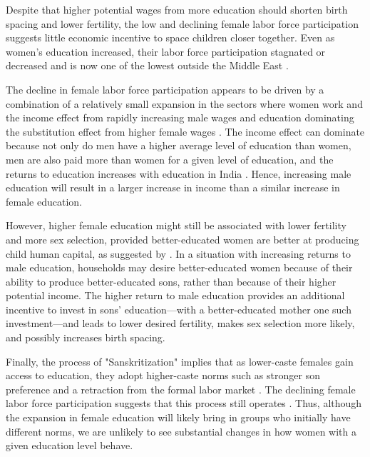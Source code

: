 \documentclass[12pt,letterpaper]{article}
\begin{document}
Despite that higher potential wages from more education should shorten birth spacing and
lower fertility, the low and declining female labor force participation suggests little
economic incentive to space children closer together.
Even as women's education increased, their labor force participation stagnated or 
decreased and is now one of the lowest outside the Middle East 
\citep{Klasen2015,Fletcher2017,Afridi2018,Bhargava2018,Chatterjee2018}.

The decline in female labor force participation appears to be driven by a combination
of a relatively small expansion in the sectors where women work and the income effect 
from rapidly increasing male wages and education dominating the substitution effect from 
higher female wages \citep{Klasen2015,Bhargava2018}.
The income effect can dominate because not only do men have a higher average level of 
education than women, men are also paid more than women for a given level of education, 
and the returns to education increases with education in India \citep{Agrawal2011}.
Hence, increasing male education will result in a larger increase in income than a 
similar increase in female education.


However, higher female education might still be associated with lower fertility and more 
sex selection, provided better-educated women are better at producing child human capital, 
as suggested by \citet{Behrman1999}. 
In a situation with increasing returns to male education, households may desire 
better-educated women because of their ability to produce better-educated sons, 
rather than because of their higher potential income. 
The higher return to male education provides an additional incentive to invest in sons' 
education---with a better-educated mother one such investment---and leads to lower desired 
fertility, makes sex selection more likely, and possibly increases birth spacing.


Finally, the process of "Sanskritization" implies that as lower-caste females gain access
to education, they adopt higher-caste norms such as stronger son preference and a
retraction from the formal labor market \citep{Srinivas1956}. 
The declining female labor force participation suggests that this process still 
operates \citep{Abraham2013,Chatterjee2018}.
Thus, although the expansion in female education will likely bring in groups who initially 
have different norms, we are unlikely to see substantial changes in how women with a given 
education level behave.
\end{document}
